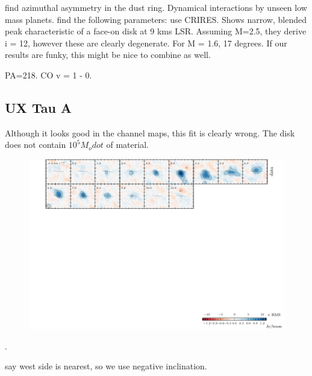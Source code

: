 \documentclass{aastex6}
\begin{document}
\citet{isella13} find azimuthal asymmetry in the dust ring. Dynamical interactions by unseen low mass planets.
\citep{andrews11a} find the following parameters:
\citep{pontoppidan11} use CRIRES. Shows narrow, blended peak characteristic of a face-on disk at 9 kms LSR. Assuming M=2.5, they derive i = 12, however these are clearly degenerate. For M = 1.6, 17 degrees. If our results are funky, this might be nice to combine as well.

PA=218. CO v = 1 - 0.



\subsection{UX Tau A}

Although it looks good in the channel maps, this fit is clearly wrong. The disk does not contain $10^5 M_odot$ of material.

\begin{figure}[htb]
\begin{center}
  \includegraphics{UXTauA.pdf}
  \end{center}
\end{figure}

\citep{espaillat07}.

\citet{tanii12} say west side is nearest, so we use negative inclination.
\end{document}
